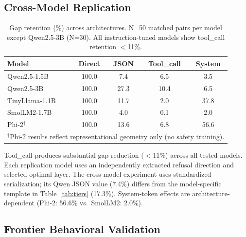 \documentclass[conference]{IEEEtran}
\begin{document}
\subsection{Cross-Model Replication}
\label{sec:cross_model}

\begin{table}[t]
\caption{Gap retention (\%) across architectures. N=50 matched pairs per model except Qwen2.5-3B (N=30). All instruction-tuned models show tool\_call retention $<$11\%.}
\label{tab:cross_model}
\centering
\small
\begin{tabular}{lcccc}
\toprule
Model & Direct & JSON & Tool\_call & System \\
\midrule
Qwen2.5-1.5B & 100.0 & 7.4 & 6.5 & 3.5 \\
Qwen2.5-3B & 100.0 & 27.3 & 10.4 & 6.5 \\
TinyLlama-1.1B & 100.0 & 11.7 & 2.0 & 37.8 \\
SmolLM2-1.7B & 100.0 & 4.0 & 0.1 & 2.0 \\
Phi-2$^\dagger$ & 100.0 & 13.6 & 6.8 & 56.6 \\
\bottomrule
\multicolumn{5}{l}{\footnotesize $^\dagger$Phi-2 results reflect representational geometry only (no safety training).}
\end{tabular}
\end{table}

Tool\_call produces substantial gap reduction ($<$11\%) across all tested models. Each replication model uses an independently extracted refusal direction and selected optimal layer. The cross-model experiment uses standardized serialization; its Qwen JSON value (7.4\%) differs from the model-specific template in Table~\ref{tab:tiers} (17.3\%). System-token effects are architecture-dependent (Phi-2: 56.6\% vs.\ SmolLM2: 2.0\%).

\subsection{Frontier Behavioral Validation}
\label{sec:frontier}
\end{document}

